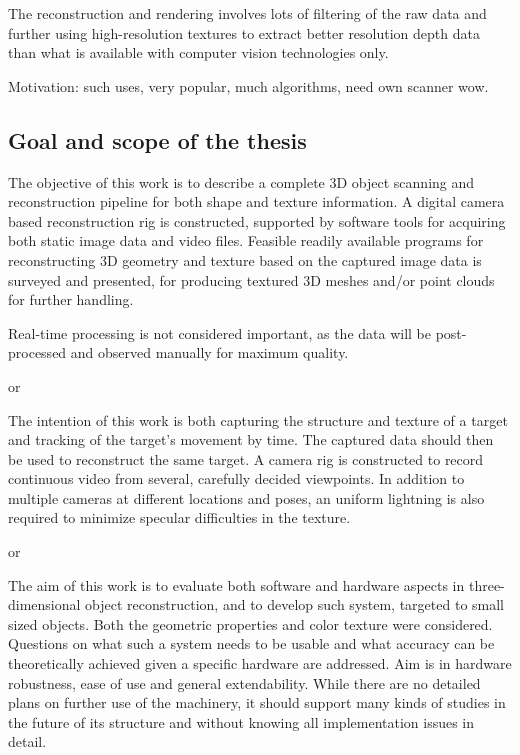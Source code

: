 
The reconstruction and rendering involves lots of filtering of the raw data and further using high-resolution textures to extract better resolution depth data than what is available with computer vision technologies only.


Motivation: such uses, very popular, much algorithms, need own scanner wow.

\subsection{Goal and scope of the thesis}



The objective of this work is to describe a complete 3D object scanning and reconstruction pipeline for both shape and texture information.
A digital camera based reconstruction rig is constructed, supported by software tools for acquiring both static image data and video files.
Feasible readily available programs for reconstructing 3D geometry and texture based on the captured image data is surveyed and presented, for producing textured 3D meshes and/or point clouds for further handling.

Real-time processing is not considered important, as the data will be post-processed and observed manually for maximum quality.

or

The intention of this work is both capturing the structure and texture of a target and tracking of the target's movement by time.
The captured data should then be used to reconstruct the same target.
A camera rig is constructed to record continuous video from several, carefully decided viewpoints.
In addition to multiple cameras at different locations and poses, an uniform lightning is also required to minimize specular difficulties in the texture.

or

The aim of this work is to evaluate both software and hardware aspects in three-dimensional object reconstruction, and to develop such system, targeted to small sized objects.
Both the geometric properties and color texture were considered.
Questions on what such a system needs to be usable and what accuracy can be theoretically achieved given a specific hardware are addressed.
Aim is in hardware robustness, ease of use and general extendability. While there are no detailed plans on further use of the machinery, it should support many kinds of studies in the future of its structure and without knowing all implementation issues in detail.

